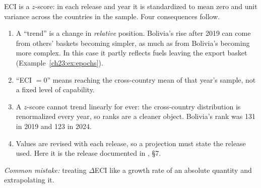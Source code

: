 \documentclass[../solutions_manual.tex]{subfiles}
\begin{document}
 ECI is a $z$-score: in each release and year it is standardized to mean zero and unit variance across the countries in the sample. Four consequences follow.
\begin{enumerate}
\item A ``trend'' is a change in \emph{relative} position. Bolivia's rise after 2019 can come from others' baskets becoming simpler, as much as from Bolivia's becoming more complex. In this case it partly reflects fuels leaving the export basket (Example~\ref{ch23:ex:epochs}).
\item ``ECI $= 0$'' means reaching the cross-country mean of that year's sample, not a fixed level of capability.
\item A $z$-score cannot trend linearly for ever: the cross-country distribution is renormalized every year, so ranks are a cleaner object. Bolivia's rank was 131 in 2019 and 123 in 2024.
\item Values are revised with each release, so a projection must state the release used. Here it is the release documented in , \S7.
\end{enumerate}
\emph{Common mistake:} treating $\Delta$ECI like a growth rate of an absolute quantity and extrapolating it.
\end{document}

